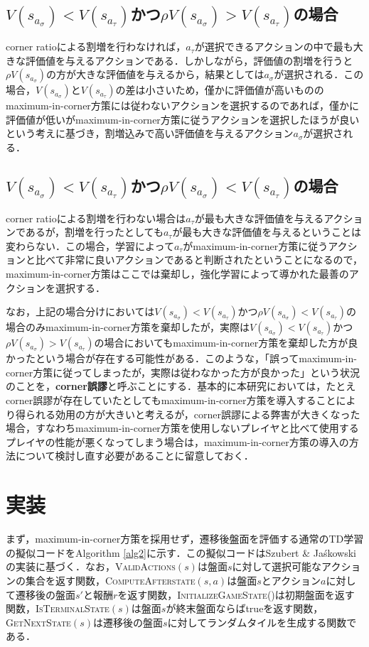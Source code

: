 \documentclass{suribt}
\begin{document}
\subsection{$V(s_{a_{\sigma}}) < V(s_{a_{\tau}})$かつ${\rho}V(s_{a_{\sigma}}) > V(s_{a_{\tau}})$の場合}
corner ratioによる割増を行わなければ，$a_{\tau}$が選択できるアクションの中で最も大きな評価値を与えるアクションである．しかしながら，評価値の割増を行うと${\rho}V(s_{a_{\sigma}})$の方が大きな評価値を与えるから，結果としては$a_{\sigma}$が選択される．この場合，$V(s_{a_{\sigma}})$と$V(s_{a_{\tau}})$の差は小さいため，僅かに評価値が高いもののmaximum-in-corner方策には従わないアクションを選択するのであれば，僅かに評価値が低いがmaximum-in-corner方策に従うアクションを選択したほうが良いという考えに基づき，割増込みで高い評価値を与えるアクション$a_{\sigma}$が選択される．

\subsection{$V(s_{a_{\sigma}}) < V(s_{a_{\tau}})$かつ${\rho}V(s_{a_{\sigma}}) < V(s_{a_{\tau}})$の場合}
corner ratioによる割増を行わない場合は$a_{\tau}$が最も大きな評価値を与えるアクションであるが，割増を行ったとしても$a_{\tau}$が最も大きな評価値を与えるということは変わらない．この場合，学習によって$a_{\tau}$がmaximum-in-corner方策に従うアクションと比べて非常に良いアクションであると判断されたということになるので，maximum-in-corner方策はここでは棄却し，強化学習によって導かれた最善のアクションを選択する．

\bigskip

なお，上記の場合分けにおいては$V(s_{a_{\sigma}}) < V(s_{a_{\tau}})$かつ${\rho}V(s_{a_{\sigma}}) < V(s_{a_{\tau}})$の場合のみmaximum-in-corner方策を棄却したが，実際は$V(s_{a_{\sigma}}) < V(s_{a_{\tau}})$かつ${\rho}V(s_{a_{\sigma}}) > V(s_{a_{\tau}})$の場合においてもmaximum-in-corner方策を棄却した方が良かったという場合が存在する可能性がある．このような，「誤ってmaximum-in-corner方策に従ってしまったが，実際は従わなかった方が良かった」という状況のことを，\textbf{corner誤謬}と呼ぶことにする．基本的に本研究においては，たとえcorner誤謬が存在していたとしてもmaximum-in-corner方策を導入することにより得られる効用の方が大きいと考えるが，corner誤謬による弊害が大きくなった場合，すなわちmaximum-in-corner方策を使用しないプレイヤと比べて使用するプレイヤの性能が悪くなってしまう場合は，maximum-in-corner方策の導入の方法について検討し直す必要があることに留意しておく．

\section{実装}
まず，maximum-in-corner方策を採用せず，遷移後盤面を評価する通常のTD学習の擬似コードをAlgorithm \ref{alg2}に示す．この擬似コードはSzubert \& Ja\'{s}kowskiの実装に基づく．なお，\textsc{ValidActions}$(s)$は盤面$s$に対して選択可能なアクションの集合を返す関数，\textsc{ComputeAfterstate}$(s,a)$は盤面$s$とアクション$a$に対して遷移後の盤面$s'$と報酬$r$を返す関数，\textsc{InitializeGameState()}は初期盤面を返す関数，\textsc{IsTerminalState}$(s)$は盤面$s$が終末盤面ならばtrueを返す関数，\textsc{GetNextState}$(s)$は遷移後の盤面$s$に対してランダムタイルを生成する関数である．
\end{document}
